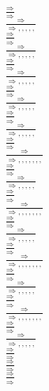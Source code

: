 \documentclass[11pt]{article}
\begin{document}
\begin{center}
\bigskip
\\$\frac{\Rightarrow }{\Rightarrow }$
\bigskip
\\$\frac{\Rightarrow }{\Rightarrow , , , , , }$
\bigskip
\\$\frac{\Rightarrow }{\Rightarrow }$
\bigskip
\\$\frac{\Rightarrow }{\Rightarrow , , , , , }$
\bigskip
\\$\frac{\Rightarrow }{\Rightarrow }$
\bigskip
\\$\frac{\Rightarrow }{\Rightarrow , , , , , }$
\bigskip
\\$\frac{\Rightarrow }{\Rightarrow }$
\bigskip
\\$\frac{\Rightarrow }{\Rightarrow , , , , , }$
\bigskip
\\$\frac{\Rightarrow }{\Rightarrow }$
\bigskip
\\$\frac{\Rightarrow }{\Rightarrow , , , , , }$
\bigskip
\\$\frac{\Rightarrow }{\Rightarrow }$
\bigskip
\\$\frac{\Rightarrow }{\Rightarrow , , , , , , , }$
\bigskip
\\$\frac{\Rightarrow }{\Rightarrow }$
\bigskip
\\$\frac{\Rightarrow }{\Rightarrow , , , , , }$
\bigskip
\\$\frac{\Rightarrow }{\Rightarrow }$
\bigskip
\\$\frac{\Rightarrow }{\Rightarrow , , , , , , , }$
\bigskip
\\$\frac{\Rightarrow }{\Rightarrow }$
\bigskip
\\$\frac{\Rightarrow }{\Rightarrow , , , , , }$
\bigskip
\\$\frac{\Rightarrow }{\Rightarrow }$
\bigskip
\\$\frac{\Rightarrow }{\Rightarrow , , , , , , , }$
\bigskip
\\$\frac{\Rightarrow }{\Rightarrow }$
\bigskip
\\$\frac{\Rightarrow }{\Rightarrow , , , , , }$
\bigskip
\\$\frac{\Rightarrow }{\Rightarrow }$
\bigskip
\\$\frac{\Rightarrow }{\Rightarrow , , , , , , , }$
\bigskip
\\$\frac{\Rightarrow }{\Rightarrow }$
\bigskip
\\$\frac{\Rightarrow }{\Rightarrow , , , , , }$
\bigskip
\\$\frac{\Rightarrow }{\Rightarrow }$
\bigskip
\\$\frac{\Rightarrow }{\Rightarrow }$
\bigskip
\\$\frac{\Rightarrow }{\Rightarrow }$

\end{center}
\end{document}
